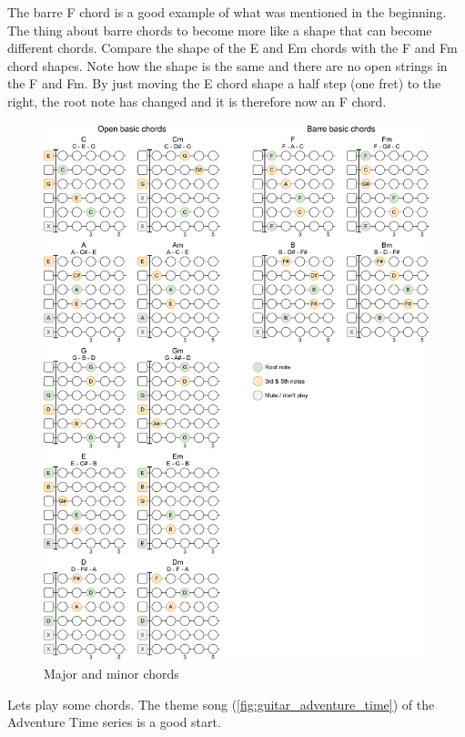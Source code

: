 The barre F chord is a good example of what was mentioned in the beginning. The thing about barre chords to become more like a shape that can become different chords. Compare the shape of the E and Em chords with the F and Fm chord shapes. Note how the shape is the same and there are no open strings in the F and Fm. By just moving the E chord shape a half step (one fret) to the right, the root note has changed and it is therefore now an F chord.

\newpage

\begin{figure}[h]
	\centering
	\includegraphics[height=0.9\textheight]{../../Images/GuitarBasicChords.png}
	\caption{Major and minor chords}
	\label{fig:guitar_major_minor_chords}
\end{figure}

\clearpage

Lets play some chords. The theme song (\autoref{fig:guitar_adventure_time}) of the Adventure Time series is a good start.

